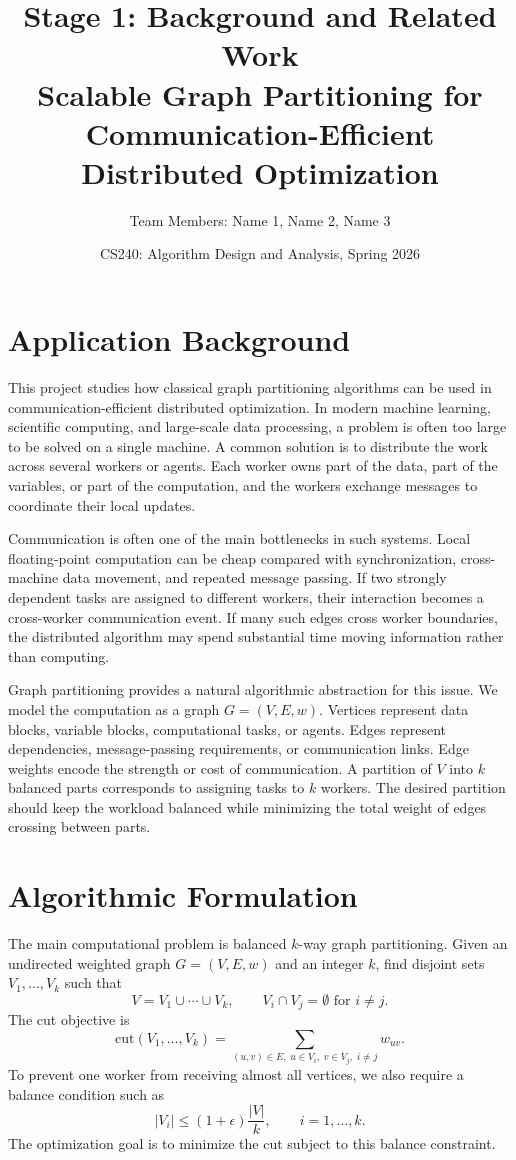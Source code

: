 \documentclass[11pt]{article}
\title{\textbf{Stage 1: Background and Related Work}\\
Scalable Graph Partitioning for Communication-Efficient Distributed Optimization}
\author{Team Members: Name 1, Name 2, Name 3}
\date{CS240: Algorithm Design and Analysis, Spring 2026}
\begin{document}
\maketitle

\section{Application Background}

This project studies how classical graph partitioning algorithms can be used in
communication-efficient distributed optimization. In modern machine learning,
scientific computing, and large-scale data processing, a problem is often too
large to be solved on a single machine. A common solution is to distribute the
work across several workers or agents. Each worker owns part of the data, part
of the variables, or part of the computation, and the workers exchange messages
to coordinate their local updates.

Communication is often one of the main bottlenecks in such systems. Local
floating-point computation can be cheap compared with synchronization,
cross-machine data movement, and repeated message passing. If two strongly
dependent tasks are assigned to different workers, their interaction becomes a
cross-worker communication event. If many such edges cross worker boundaries,
the distributed algorithm may spend substantial time moving information rather
than computing.

Graph partitioning provides a natural algorithmic abstraction for this issue.
We model the computation as a graph $G=(V,E,w)$. Vertices represent data
blocks, variable blocks, computational tasks, or agents. Edges represent
dependencies, message-passing requirements, or communication links. Edge
weights encode the strength or cost of communication. A partition of $V$ into
$k$ balanced parts corresponds to assigning tasks to $k$ workers. The desired
partition should keep the workload balanced while minimizing the total weight
of edges crossing between parts.

\section{Algorithmic Formulation}

The main computational problem is balanced $k$-way graph partitioning. Given an
undirected weighted graph $G=(V,E,w)$ and an integer $k$, find disjoint sets
$V_1,\ldots,V_k$ such that
\[
    V = V_1 \cup \cdots \cup V_k,
    \qquad V_i \cap V_j = \emptyset \text{ for } i\neq j.
\]
The cut objective is
\[
    \mathrm{cut}(V_1,\ldots,V_k)
    =
    \sum_{(u,v)\in E,\; u\in V_i,\; v\in V_j,\; i\neq j} w_{uv}.
\]
To prevent one worker from receiving almost all vertices, we also require a
balance condition such as
\[
    |V_i| \leq (1+\epsilon)\frac{|V|}{k},
    \qquad i=1,\ldots,k.
\]
The optimization goal is to minimize the cut subject to this balance
constraint.
\end{document}
